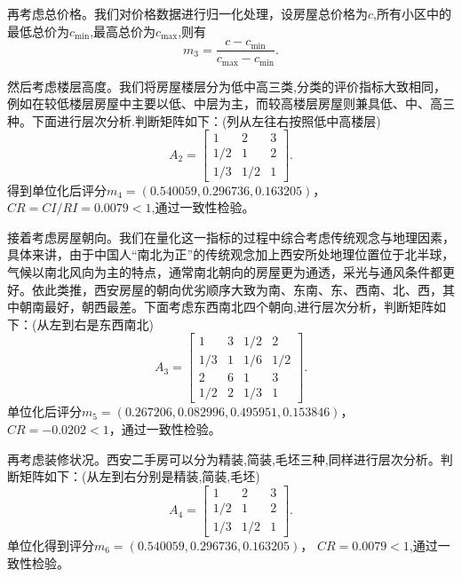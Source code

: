 \documentclass[withoutpreface,bwprint]{cumcmthesis} %
\begin{document}
再考虑总价格。我们对价格数据进行归一化处理，设房屋总价格为$c$,所有小区中的最低总价为$c_{\min}$,最高总价为$c_{\max}$,则有
\begin{equation}
    m_3=\frac{c-c_{\min}}{c_{\max}-c_{\min}}.
\end{equation}

然后考虑楼层高度。我们将房屋楼层分为低中高三类,分类的评价指标大致相同，例如在较低楼层房屋中主要以低、中层为主，而较高楼层房屋则兼具低、中、高三种。下面进行层次分析.判断矩阵如下：(列从左往右按照低中高楼层)
\begin{equation}
    A_2=\begin{bmatrix}
        1 & 2 &3 \\
        1/2 & 1 &2\\
        1/3 & 1/2 & 1
    \end{bmatrix}.
\end{equation}
得到单位化后评分$m_4=(0.540059,0.296736,0.163205)$，
$CR=CI/RI=0.0079<1$,通过一致性检验。

接着考虑房屋朝向。我们在量化这一指标的过程中综合考虑传统观念与地理因素，具体来讲，由于中国人“南北为正”的传统观念加上西安所处地理位置位于北半球，气候以南北风向为主的特点，通常南北朝向的房屋更为通透，采光与通风条件都更好。依此类推，西安房屋的朝向优劣顺序大致为南、东南、东、西南、北、西，其中朝南最好，朝西最差。下面考虑东西南北四个朝向,进行层次分析，判断矩阵如下：(从左到右是东西南北)
\begin{equation}
    A_3=\begin{bmatrix}
        1 & 3 & 1/2 & 2\\
        1/3 & 1 & 1/6 & 1/2\\
        2 & 6 & 1 & 3\\
        1/2 & 2 & 1/3 & 1
    \end{bmatrix}.
\end{equation}
单位化后评分$m_5=(0.267206,0.082996,0.495951,0.153846)$，
$CR=-0.0202<1$，通过一致性检验。

再考虑装修状况。西安二手房可以分为精装,简装,毛坯三种,同样进行层次分析。判断矩阵如下：(从左到右分别是精装,简装,毛坯)
\begin{equation}
    A_4=\begin{bmatrix}
    1 & 2 &3\\
    1/2 & 1 & 2\\
    1/3 & 1/2 & 1
    \end{bmatrix}.
\end{equation}
单位化得到评分$m_6=(0.540059,0.296736,0.163205)$，
$CR=0.0079<1$,通过一致性检验。
\end{document}
